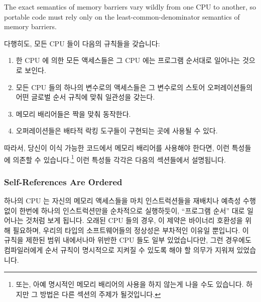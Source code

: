 The exact semantics of memory barriers vary wildly from one CPU to
another, so portable code must rely only on the least-common-denominator
semantics of memory barriers.
\fi

다행히도, 모든 CPU 들이 다음의 규칙들을 갖습니다:
\begin{enumerate}
\item	한 CPU 에 의한 모든 액세스들은 그 CPU 에는 프로그램 순서대로 일어나는
	것으로 보인다.
\item	모든 CPU 들의 하나의 변수로의 액세스들은 그 변수로의 스토어
	오퍼레이션들의 어떤 글로벌 순서 규칙에 맞춰 일관성을 갖는다.
\item	메모리 배리어들은 짝을 맞춰 동작한다.
\item	오퍼레이션들은 배타적 락킹 도구들이 구현되는 곳에 사용될 수 있다.
\end{enumerate}

따라서, 당신이 이식 가능한 코드에서 메모리 배리어를 사용해야 한다면, 이런
특성들에 의존할 수 있습니다.\footnote{
	또는, 아예 명시적인 메모리 배리어의 사용을 하지 않는게 나을 수도
	있습니다.
	하지만 그 방법은 다른 섹션의 주제가 될것입니다.}
이런 특성들 각각은 다음의 섹션들에서 설명됩니다.

\subsubsection{Self-References Are Ordered}

하나의 CPU 는 자신의 메모리 액세스들을 마치 인스트럭션들을 재배치나 예측성 수행
없이 한번에 하나의 인스트럭션만을 순차적으로 실행하듯이, ``프로그램 순서'' 대로
일어나는 것처럼 보게 됩니다.
오래된 CPU 들의 경우, 이 제약은 바이너리 호환성을 위해 필요하며, 우리의 타입의
소프트웨어들의 정상성은 부차적인 이유일 뿐입니다.
이 규칙을 제한된 범위 내에서나마 위반한 CPU 들도 일부 있었습니다만, 그런
경우에도 컴파일러에게 순서 규칙이 명시적으로 지켜질 수 있도록 해야 할 의무가
지워져 있었습니다.

